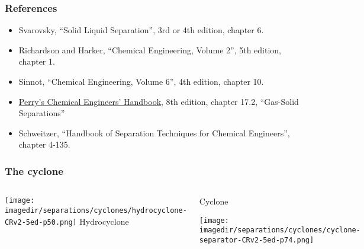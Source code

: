 

\begin{frame}\frametitle{References}
	\begin{itemize}
		\item	Svarovsky, ``Solid Liquid Separation'', 3rd or 4th edition, chapter 6.%
		\item	Richardson and Harker, ``Chemical Engineering, Volume 2'', 5th edition, chapter 1.
		\item	Sinnot, ``Chemical Engineering, Volume 6'', 4th edition, chapter 10.
		\item	\href{http://accessengineeringlibrary.com/browse/perrys-chemical-engineers-handbook-eighth-edition}{Perry's Chemical Engineers' Handbook}, 8th edition, chapter 17.2, ``Gas-Solid Separations''
		\item	Schweitzer, ``Handbook of Separation Techniques for Chemical Engineers'', chapter 4-135.
	\end{itemize}
\end{frame}

\begin{frame}\frametitle{The cyclone}
	\vspace{-24pt}
	\begin{columns}[b]
			\begin{center}
				\texttt{[image: \\imagedir/separations/cyclones/hydrocyclone-CRv2-5ed-p50.png]}
				Hydrocyclone
			\end{center}
			\begin{center}
				Cyclone
				\vspace{12pt}

				\texttt{[image: \\imagedir/separations/cyclones/cyclone-separator-CRv2-5ed-p74.png]}
			\end{center}
	\end{columns}
\end{frame}

